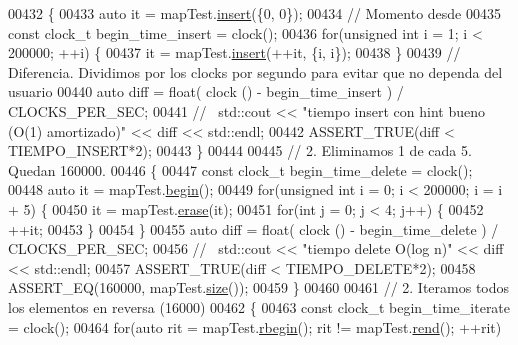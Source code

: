 \begin{DoxyCode}
00432     \{
00433         \textcolor{keyword}{auto} it = mapTest.\hyperlink{classaed2_1_1map_a60aacba06b1579630b3c8e996cf248c8_a60aacba06b1579630b3c8e996cf248c8}{insert}(\{0, 0\});
00434         \textcolor{comment}{// Momento desde}
00435         \textcolor{keyword}{const} clock\_t begin\_time\_insert = clock();
00436         \textcolor{keywordflow}{for}(\textcolor{keywordtype}{unsigned} \textcolor{keywordtype}{int} i = 1; i < 200000; ++i) \{
00437             it = mapTest.\hyperlink{classaed2_1_1map_a60aacba06b1579630b3c8e996cf248c8_a60aacba06b1579630b3c8e996cf248c8}{insert}(++it, \{i, i\});
00438         \}
00439         \textcolor{comment}{// Diferencia. Dividimos por los clocks por segundo para evitar que no dependa del usuario}
00440         \textcolor{keyword}{auto} diff = float( clock () - begin\_time\_insert ) /  CLOCKS\_PER\_SEC;
00441         \textcolor{comment}{//~ std::cout << "tiempo insert con hint bueno (O(1) amortizado)" << diff << std::endl;}
00442         ASSERT\_TRUE(diff < TIEMPO\_INSERT*2);
00443     \}
00444 
00445     \textcolor{comment}{// 2. Eliminamos 1 de cada 5. Quedan 160000.}
00446     \{
00447         \textcolor{keyword}{const} clock\_t begin\_time\_delete = clock();
00448         \textcolor{keyword}{auto} it = mapTest.\hyperlink{classaed2_1_1map_a58a95705d54b3dda7f775ce5a22225cb_a58a95705d54b3dda7f775ce5a22225cb}{begin}();
00449         \textcolor{keywordflow}{for}(\textcolor{keywordtype}{unsigned} \textcolor{keywordtype}{int} i = 0; i < 200000; i = i + 5) \{
00450             it = mapTest.\hyperlink{classaed2_1_1map_ad8e796bf9c9c558e5ce6b61e116253fe_ad8e796bf9c9c558e5ce6b61e116253fe}{erase}(it);
00451             \textcolor{keywordflow}{for}(\textcolor{keywordtype}{int} j = 0; j < 4; j++) \{
00452                 ++it;
00453             \}
00454         \}
00455         \textcolor{keyword}{auto} diff = float( clock () - begin\_time\_delete ) /  CLOCKS\_PER\_SEC;
00456         \textcolor{comment}{//~ std::cout << "tiempo delete O(log n)" << diff << std::endl;}
00457         ASSERT\_TRUE(diff < TIEMPO\_DELETE*2);
00458         ASSERT\_EQ(160000, mapTest.\hyperlink{classaed2_1_1map_aa6e806b3be6dc0da79adbfae08b571bf_aa6e806b3be6dc0da79adbfae08b571bf}{size}());
00459     \}
00460 
00461     \textcolor{comment}{// 2. Iteramos todos los elementos en reversa (16000)}
00462     \{
00463         \textcolor{keyword}{const} clock\_t begin\_time\_iterate = clock();
00464         \textcolor{keywordflow}{for}(\textcolor{keyword}{auto} rit = mapTest.\hyperlink{classaed2_1_1map_ac412d3902112122c1bffe2d4283a4e9d_ac412d3902112122c1bffe2d4283a4e9d}{rbegin}(); rit != mapTest.\hyperlink{classaed2_1_1map_a277f03b4f4b6b98879e4e4921081801f_a277f03b4f4b6b98879e4e4921081801f}{rend}(); ++rit)

\end{DoxyCode}
